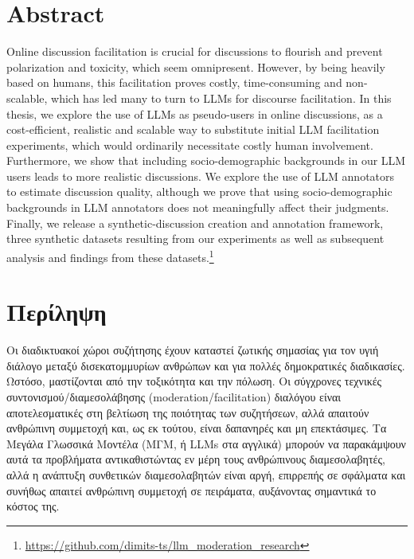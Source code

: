 %

\let\cleardoublepage\clearpage

\chapter*{Abstract}
\label{sec:abstract}

Online discussion facilitation is crucial for discussions to flourish and prevent polarization and toxicity, which seem omnipresent. However, by being heavily based on humans, this facilitation proves costly, time-consuming and non-scalable, which has led many to turn to LLMs for discourse facilitation. In this thesis, we explore the use of LLMs as pseudo-users in online discussions, as a cost-efficient, realistic and scalable way to substitute initial LLM facilitation experiments, which would ordinarily necessitate costly human involvement. Furthermore, we show that including socio-demographic backgrounds in our LLM users leads to more realistic discussions. We explore the use of LLM annotators to estimate discussion quality, although we prove that using socio-demographic backgrounds in LLM annotators does not meaningfully affect their judgments. Finally, we release a synthetic-discussion creation and annotation framework, three synthetic datasets resulting from our experiments as well as subsequent analysis and findings from these datasets.\footnote{\url{https://github.com/dimits-ts/llm_moderation_research}}


\chapter*{Περίληψη}
\label{sec:abstract_greek}


Οι διαδικτυακοί χώροι συζήτησης έχουν καταστεί ζωτικής σημασίας για τον υγιή διάλογο μεταξύ δισεκατομμυρίων ανθρώπων και για πολλές δημοκρατικές διαδικασίες. Ωστόσο, μαστίζονται από την τοξικότητα και την πόλωση. Οι σύγχρονες τεχνικές συντονισμού/διαμεσολάβησης (moderation/facilitation) διαλόγου είναι αποτελεσματικές στη βελτίωση της ποιότητας των συζητήσεων, αλλά απαιτούν ανθρώπινη συμμετοχή και, ως εκ τούτου, είναι δαπανηρές και μη επεκτάσιμες. Τα Μεγάλα Γλωσσικά Μοντέλα (ΜΓΜ, ή LLMs στα αγγλικά) μπορούν να παρακάμψουν αυτά τα προβλήματα αντικαθιστώντας εν μέρη τους ανθρώπινους διαμεσολαβητές, αλλά η ανάπτυξη συνθετικών διαμεσολαβητών είναι αργή, επιρρεπής σε σφάλματα και συνήθως απαιτεί ανθρώπινη συμμετοχή σε πειράματα, αυξάνοντας σημαντικά το κόστος της. 

